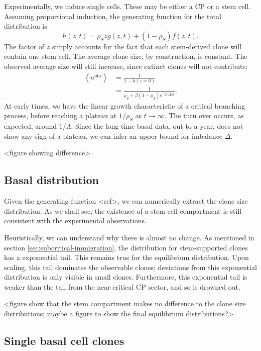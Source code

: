 \documentclass[10pt,UKenglish]{article}
\begin{document}
Experimentally, we induce single cells. These may be either a CP or a stem cell. Assuming proportional induction, the generating function for the total distribution is $$h(z,t) = \rho_S z g(z,t) + (1-\rho_S) f(z,t).$$ The factor of $z$ simply accounts for the fact that each stem-derived clone will contain one stem cell. The average clone size, by construction, is constant. The observed average size will still increase, since extinct clones will not contribute: 
\begin{align*}
\left\langle n^\textrm{obs} \right\rangle &= \frac{1}{1 - h(z=0)} \\
  &= \frac{1}{\rho_S + \beta (1-\rho_S) e^{-2 r \Delta \lambda t}}.
\end{align*}
At early times, we have the linear growth characteristic of a critical branching process, before reaching a plateau at $1/\rho_S$ as $t\rightarrow\infty$. The turn over occurs, as expected, around $1/\Lambda$. Since the long time basal data, out to a year, does not show any sign of a plateau, we can infer an upper bound for imbalance $\Delta$.

<figure showing difference>

\subsection{Basal distribution}

Given the generating function <ref>, we can numerically extract the clone size distribution. As we shall see, the existence of a stem cell compartment is still consistent with the experimental observations.

Heuristically, we can understand why there is almost no change. As mentioned in section \ref{sec:subcritical-immigration}, the distribution for stem-supported clones has a exponential tail. This remains true for the equilibrium distribution. Upon scaling, this tail dominates the observable clones; deviations from this exponential distribution is only visible in small clones. Furthermore, this exponential tail is weaker than the tail from the near critical CP sector, and so is drowned out.

<figure show that the stem compartment makes no difference to the clone size distributions; maybe a figure to show the final equilibrium distributions?>

\subsection{\label{sec:single-cells}Single basal cell clones}
\end{document}
